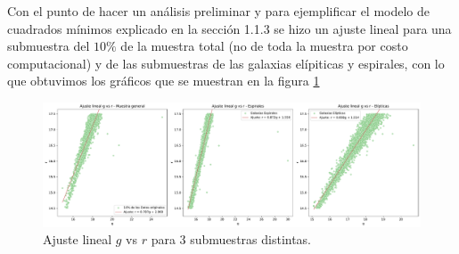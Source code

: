 \documentclass[twocolumn]{article}
\begin{document}
Con el punto de hacer un análisis preliminar y para ejemplificar el modelo de cuadrados mínimos explicado en la sección 1.1.3 se hizo un ajuste lineal para una submuestra del $10\%$ de la muestra total (no de toda la muestra por costo computacional) y de las submuestras de las galaxias elípiticas y espirales, con lo que obtuvimos los gráficos que se muestran en la figura \ref{fig:lineal}

\begin{figure}[ht]
\includegraphics[width=\linewidth]{ajustes_lineales_comparacion.pdf}
\caption{Ajuste lineal $g$ vs $r$ para 3 submuestras distintas.}
\label{fig:lineal}
\end{figure}
\end{document}
